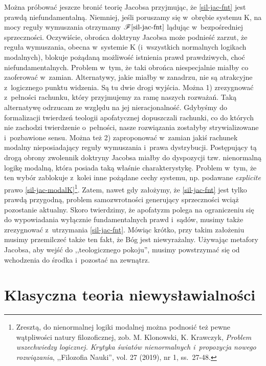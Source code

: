 Można próbować jeszcze bronić teorię Jacobsa przyjmując, że \ref{sil-jac-fnt} jest prawdą niefundamentalną. Niemniej, jeśli poruszamy się w~obrębie systemu K, na mocy reguły wymuszania otrzymamy $\mathscr{F} \eqref{sil-jac-fnt}$ lądując w~bezpośredniej sprzeczności. Oczywiście, obrońca doktryny Jacobsa może podnieść zarzut, że reguła wymuszania, obecna w~systemie K (i~wszystkich normalnych logikach modalnych), blokuje pożądaną możliwość istnienia prawd prawdziwych, choć niefundamentalnych. Problem w~tym, że taki obrońca niespecjalnie miałby co zaoferować w~zamian. Alternatywy, jakie miałby w zanadrzu, nie są atrakcyjne z~logicznego punktu widzenia. Są tu dwie drogi wyjścia. Można 1) zrezygnować z~pełności rachunku, który przyjmujemy za ramę naszych rozważań. Taką alternatywę odrzucam ze względu na jej nieracjonalność. Gdybyśmy do formalizacji twierdzeń teologii apofatycznej dopuszczali rachunki, co do których nie zachodzi twierdzenie o~pełności, nasze rozwiązania zostałyby strywializowane i~pozbawione sensu. Można też 2) zaproponować w~zamian jakiś rachunek modalny nieposiadający reguły wymuszania i~prawa dystrybucji. Postępujący tą drogą obrony zwolennik doktryny Jacobsa miałby do dyspozycji tzw. nienormalną logikę modalną, która posiada taką właśnie charakterystykę. Problem w~tym, że ten wybór zablokuje z~kolei inne pożądane cechy systemu, np. podawane \textit{explicite} prawo \eqref{sil-jac-modalK}\footnote{Zresztą, do nienormalnej logiki modalnej można podnosić też pewne wątpliwości natury filozoficznej, zob. M. Klonowski, K. Krawczyk, \textit{Problem wszechwiedzy logicznej. Krytyka światów nienormalnych i~propozycja nowego rozwiązania}, ,,Filozofia Nauki'', vol. 27 (2019), nr 1, ss.~27-48.}. Zatem, nawet gdy założymy, że \ref{sil-jac-fnt} jest tylko prawdą przygodną, problem samozwrotności generujący sprzeczności wciąż pozostanie aktualny. Skoro twierdzimy, że apofatyzm polega na ograniczeniu się do wypowiadania wyłącznie fundamentalnych prawd i~sądów, musimy także zrezygnować z~utrzymania \ref{sil-jac-fnt}. Mówiąc krótko, przy takim założeniu musimy przemilczeć także ten fakt, że Bóg jest niewyrażalny. Używając metafory Jacobsa, aby wejść do ,,teologicznego pokoju'', musimy powstrzymać się od wchodzenia do środka i~pozostać na zewnątrz.


\chapter{Klasyczna teoria niewysławialności}\label{sil-boch}


